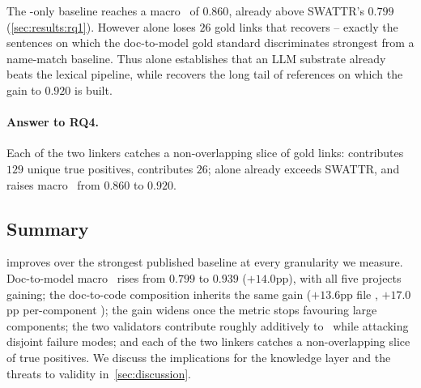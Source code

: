 The \linkerB{}-only baseline reaches a macro \fone\ of $0.860$, already above SWATTR's $0.799$ (\autoref{sec:results:rq1}).
However \linkerB{} alone loses $26$ gold links that \linkerC{} recovers -- exactly the sentences on which the doc-to-model gold standard discriminates strongest from a name-match baseline.
Thus \linkerB{} alone establishes that an \ac{LLM} substrate already beats the lexical pipeline, while \linkerC{} recovers the long tail of references on which the gain to $0.920$ is built.

\begin{rqanswer}
\paragraph{Answer to RQ4.}
Each of the two linkers catches a non-overlapping slice of gold links: \linkerB{} contributes $129$ unique true positives, \linkerC{} contributes $26$; \linkerB{} alone already exceeds SWATTR, and \linkerC{} raises macro \fone\ from $0.860$ to $0.920$.
\end{rqanswer}

\subsection{Summary}
\label{sec:results:summary}

\approach{} improves over the strongest published baseline at every granularity we measure.
Doc-to-model macro \fone\ rises from $0.799$ to $0.939$ ($+14.0$pp), with all five projects gaining; the doc-to-code composition inherits the same gain ($+13.6$pp file \fone, $+17.0$pp per-component \fone); the gain widens once the metric stops favouring large components; the two validators contribute roughly additively to \fone\ while attacking disjoint failure modes; and each of the two linkers catches a non-overlapping slice of true positives.
We discuss the implications for the knowledge layer and the threats to validity in~\autoref{sec:discussion}.
